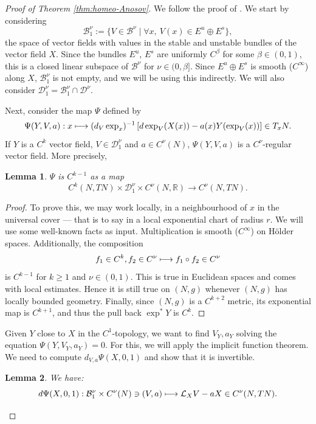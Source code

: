 \documentclass[JEP,XML,SOM,Unicode,NoFloatCountersInSection]{cedram}
\newcommand\mto{\mathchoice{\longmapsto}{\mapsto}{\mapsto}{\mapsto}}
\newcommand{\R}{\mathbb{R}}
\theoremstyle{plain}
\newtheorem{lemma}{Lemma}[section]
\theoremstyle{definition}
\begin{document}
\begin{proof}[Proof of Theorem \ref{thm:homeo-Anosov}]
We follow the proof of \cite{DeLaLlave-Marco-Moryon-86}. We start by considering
\[
\mathcal{B}_1^\nu:= \{ V \in \mathcal{B}^\nu\mid \forall x,\ V(x) \in E^u \oplus E^s\},
\]
the space of vector fields with values in the stable and unstable bundles of the vector field $X$.
Since the bundles $E^u$, $E^s$ are uniformly $C^{\beta}$ for some $\beta\in (0,1)$, this is a closed linear subspace of $\mathcal{B}^\nu$ for $\nu \in (0, \beta]$. Since $E^u\oplus E^s$ is smooth ($C^\infty$) along $X$, $\mathcal{B}_1^\nu$ is not empty, and we will be using this indirectly. We will also consider $\mathcal{D}_1^\nu = \mathcal{B}_1^\nu \cap \mathcal{D}^\nu$.

Next, consider the map $\Psi$ defined by
\[
\Psi(Y,V,a) : x \mto (d_V\exp_x)^{-1}\left[d\exp_{V}(X(x)) - a(x) Y(\exp_{V}(x)) \right]\in T_x N.
\]
If $Y$ is a $C^{k}$ vector field, $V \in \mathcal{D}_1^\nu$ and $a\in C^\nu(N)$, $\Psi(Y,V,a)$ is a $C^\nu$-regular vector field. More precisely,

\begin{lemma}
$\Psi$ is $C^{k-1}$ as a map
\[
C^k(N,TN) \times \mathcal{D}_1^\nu \times C^\nu(N,\R) \to C^\nu(N, TN).
\]
\end{lemma}

\begin{proof}
To prove this, we may work locally, in a neighbourhood of $x$ in the universal cover --- that is to say in a local exponential chart of radius $r$. We will use some well-known facts as input. Multiplication is smooth ($C^\infty$) on H\"older spaces. Additionally, the composition
\[
f_1\in C^k, f_2 \in C^\nu \mto f_1 \circ f_2 \in C^\nu
\]
is $C^{k-1}$ for $k\geq 1$ and $\nu \in (0,1)$. This is true in Euclidean spaces and comes with local estimates. Hence it is still true on $(N,g)$ whenever $(N,g)$ has locally bounded geometry. Finally, since $(N,g)$ is a $C^{k+2}$ metric, its exponential map is $C^{k+1}$, and thus the pull back $\exp^\ast Y$ is $C^k$.
\end{proof}

Given $Y$ close to $X$ in the $C^1$-topology, we want to find $V_Y,a_Y$ solving the equation $\Psi(Y,V_Y,a_Y) = 0$. For this, we will apply the implicit function theorem. We need to compute $d_{V,a} \Psi(X,0, 1)$ and show that it is invertible.

\begin{lemma}
We have:
\[
d \Psi(X,0, 1) : \mathcal{B}_1^\nu\times C^\nu (N) \ni (V,a) \mto \mathcal{L}_X V - a X \in C^\nu(N,TN).
\]
\end{lemma}


\end{proof}
\end{document}
